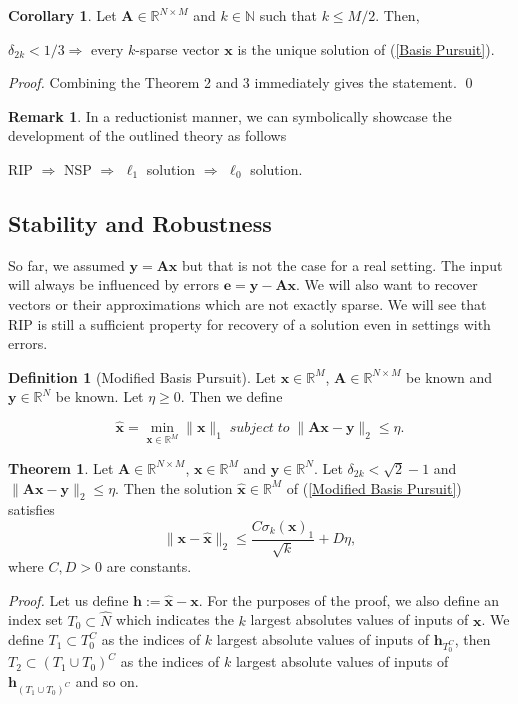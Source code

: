 \documentclass[11pt,oneside,czech,american]{book} %
\theoremstyle{definition} %
\newtheorem{thm}{Theorem}
\theoremstyle{definition}
\newtheorem{defn}{Definition}
\newtheorem{rmrk}{Remark}
\newtheorem{coro}{Corollary}
\begin{document}
\begin{coro}
	Let $\bm{A} \in \mathbb{R}^{N \times M}$ and $k \in \mathbb{N}$ such that $k \leq M/2$. Then,
	\begin{center}
		$\delta_{2k} < 1/3 \Rightarrow$  every $k$-sparse vector $\bm{x}$ is the unique solution of (\ref{Basis Pursuit}).
	\end{center}
\end{coro}
\emph{Proof.} Combining the Theorem 2 and 3 immediately gives the statement.
\qed

\begin{rmrk}
	In a reductionist manner, we can symbolically showcase the development of the outlined theory as follows
	\begin{center}
		RIP $\Rightarrow$ NSP $\Rightarrow$ $\ell_{1}$ solution $\Rightarrow$ $\ell_{0}$ solution.
	\end{center}
\end{rmrk}
\subsection*{Stability and Robustness}
So far, we assumed $\bm{y} = \bm{Ax}$ but that is not the case for a real setting. The input will always be influenced by errors $\bm{e} = \bm{y} - \bm{Ax}$. We will also want to recover vectors or their approximations which are not exactly sparse. We will see that RIP is still a sufficient property for recovery of a solution even in settings with errors.

\begin{defn}[Modified Basis Pursuit]
	Let $\bm{x} \in \mathbb{R}^{M}$, $\bm{A} \in \mathbb{R}^{N \times M}$ be known and $\bm{y} \in \mathbb{R}^{N}$ be known. Let $\eta \geq 0$. Then we define
	
	\begin{equation}
		\bm{\hat{x}} = \min_{\bm{{x}} \in \mathbb{R}^{M}}\lVert \bm{x}\rVert_{1} \; subject \; to\;  \lVert \bm{A} \bm{x} - \bm{y} \rVert_2 \leq \eta. \label{Modified Basis Pursuit}
	\end{equation}
\end{defn}

\begin{thm}
	Let $\bm{A} \in \mathbb{R}^{N \times M}$, $\bm{x} \in \mathbb{R}^{M}$ and $\bm{y} \in \mathbb{R}^{N}$. Let $\delta_{2k} < \sqrt 2  -1$ and $\lVert \bm{Ax}-\bm{y}\rVert_2 \leq \eta$. Then the solution $\bm{\hat{x}} \in \mathbb{R}^M$ of (\ref{Modified Basis Pursuit}) satisfies
	\begin{equation}
		\lVert\bm{x} - \bm{\hat{x}}\rVert_2 \leq \frac{C \sigma_k(\bm{x})_1}{\sqrt k} + D \eta, \label{approximation of solution}
	\end{equation}
where $C,D > 0$ are constants.
\end{thm}
\emph{Proof.} Let us define $\bm{h}:= \hat{\bm{x}} - \bm{x}$. For the purposes of the proof, we also define an index set $T_0 \subset \hat{N}$ which indicates the $k$ largest absolutes values of inputs of $\bm{x}$. We define $T_1 \subset T^C_0$ as the indices of $k$ largest absolute values of inputs of $\bm{h}_{T^C_0}$, then $T_2 \subset (T_1 \cup T_0)^C$ as the indices of $k$ largest absolute values of inputs of $\bm{h}_{(T_1 \cup T_0)^C}$ and so on.
\end{document}
